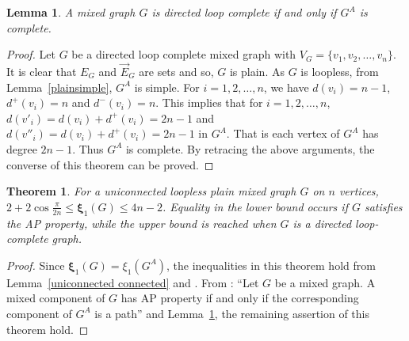 \documentclass[12pt]{article}
\numberwithin{equation}{section}
\newtheorem{thm}{Theorem}[section]
\newtheorem{lemma}{Lemma}[section]
\begin{document}
	\begin{lemma}\label{complete}
		A mixed graph $G$ is directed loop complete if and only if $G^A$ is complete.
	\end{lemma}
	\begin{proof}
		Let $G$ be a directed loop complete mixed graph with $V_G=\{v_1,v_2,\ldots,v_n\}$. It is clear that $E_G$ and $\vec{E}_G$ are sets and so, $G$ is plain. As $G$ is loopless, from Lemma~\ref{plainsimple}, $G^A$ is simple. For $i=1,2,\ldots,n$, we have $d(v_i)=n-1$, $d^+(v_i)=n$ and $d^-(v_i)=n$. This implies that for $i=1,2,\ldots,n$, $d(v'_i)=d(v_i)+d^+(v_i)=2n-1$ and  $d(v''_i)=d(v_i)+d^+(v_i)=2n-1$ in $G^A$. That is each vertex of $G^A$ has degree $2n-1$. Thus $G^A$ is complete.
		By retracing the above arguments, the converse of this theorem can be proved.
	\end{proof}
	\begin{thm}
		For a uniconnected loopless plain mixed graph $G$ on $n$ vertices, $2+2\cos{\frac{\pi}{2n}}\leq\bm{\xi}_1(G)\leq 4n-2$. Equality in the lower bound occurs if $G$ satisfies the AP property, while the upper bound is reached when $G$ is a directed loop-complete graph.
	\end{thm}
	\begin{proof}
		Since $\bm{\xi}_1(G)=\xi_1(G^A)$, the inequalities in this theorem hold from Lemma~\ref{uniconnected connected} and \cite[Proposition~7.8.17]{cvetkovic}.
		From \cite[Lemma~7.2]{Kalaimatrices1}: ``Let $G$ be a mixed graph. A mixed component of $G$ has AP property if and only if the corresponding component of $G^A$ is a path'' and Lemma~\ref{complete}, the remaining assertion of this theorem hold. 
	\end{proof}
	
\end{document}
